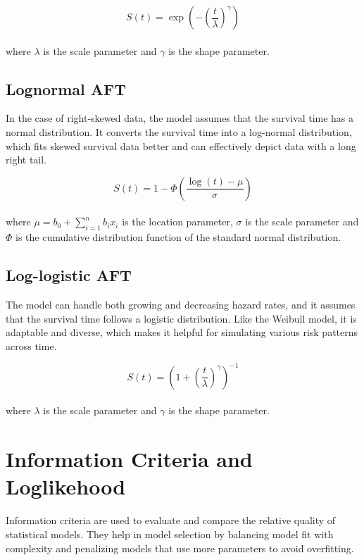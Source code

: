\documentclass[doublespacing,12pt]{report}
\begin{document}
\begin{equation}
    S(t) = \exp\left(-\left(\frac{t}{\lambda}\right)^\gamma\right)
\end{equation}\\
where \(\lambda\) is the scale parameter and \(\gamma\) is the shape parameter.

\subsection{Lognormal AFT}
In the case of right-skewed data, the model assumes that the survival time has a normal distribution. It converts the survival time into a log-normal distribution, which fits skewed survival data better and can effectively depict data with a long right tail.

\begin{equation}
    S(t) = 1 - \Phi\left(\frac{\log(t) - \mu}{\sigma}\right)
\end{equation}\\
where \(\mu = b_0 + \sum_{i=1}^{n}{b_i x_i}\) is the location parameter, \(\sigma\) is the scale parameter and \(\Phi\) is the cumulative distribution function of the standard normal distribution.

\subsection{Log-logistic AFT}
The model can handle both growing and decreasing hazard rates, and it assumes that the survival time follows a logistic distribution. Like the Weibull model, it is adaptable and diverse, which makes it helpful for simulating various risk patterns across time.


\begin{equation}
    S(t) = \left(1 + \left(\frac{t}{\lambda}\right)^\gamma\right)^{-1}
\end{equation}\\
where \(\lambda\) is the scale parameter and \(\gamma\) is the shape parameter.


 
\section{Information Criteria and Loglikehood}

Information criteria are used to evaluate and compare the relative quality of statistical models. They help in model selection by balancing model fit with complexity and penalizing models that use more parameters to avoid overfitting.
\end{document}
